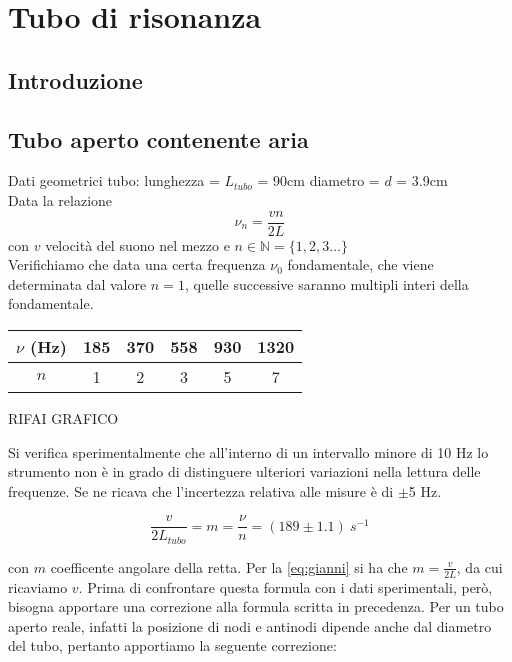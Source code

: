 
\chapter{Tubo di risonanza}
\section{Introduzione}
\section{Tubo aperto contenente aria}
Dati geometrici tubo:
lunghezza = $L_{tubo}$ = 90cm
diametro = $d$ = 3.9cm
\\
Data la relazione
\begin{equation} \label{eq:gianni}
\nu_n= \frac{vn}{2L}		
\end{equation}
 con $v$ velocità del suono nel mezzo e $n \in \mathbb{N} = \{1,2,3\dots\}$ 
\\

Verifichiamo che data una certa frequenza $\nu_0$ fondamentale, che viene determinata dal valore $n=1$, quelle successive saranno multipli interi della fondamentale. 



\begin{center}
\begin{tabular}{c|c|c|c|c|c}
$\nu$ (Hz) & 185 & 370 & 558 & 930 & 1320 \\
\midrule
$n$ & 1 & 2 & 3 & 5 & 7\\
\end{tabular}
\end{center}

RIFAI GRAFICO

Si verifica sperimentalmente che all'interno di un intervallo minore di 10 Hz lo strumento non è in grado di distinguere ulteriori variazioni nella lettura delle frequenze. Se ne ricava che l'incertezza relativa alle misure è di $\pm$5 Hz.

$$ \frac{v}{2L_{tubo}} = m = \frac{\nu}{n} = (189 \pm 1.1)\ s^{-1}$$

con $m$  coefficente angolare della retta. Per la \ref{eq:gianni} si ha che $\displaystyle{m=\frac{v}{2L}}$, da cui ricaviamo $v$. Prima di confrontare questa formula con i dati sperimentali, però, bisogna apportare una correzione alla formula scritta in precedenza. Per un tubo aperto reale, infatti la posizione di nodi e antinodi dipende anche dal diametro del tubo, pertanto apportiamo la seguente correzione:


